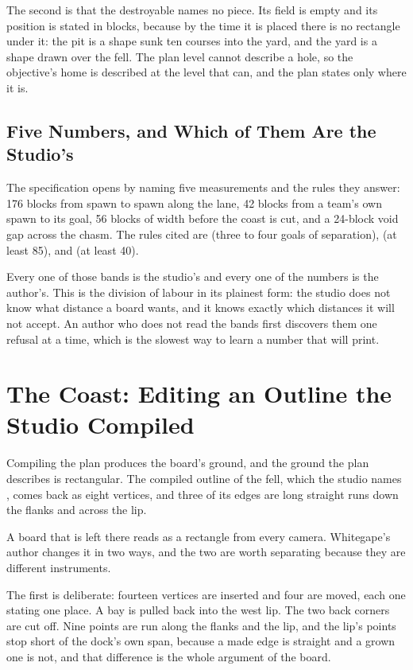 The second is that the destroyable names no piece. Its  field is
empty and its position is stated in blocks, because by the time it is placed
there is no rectangle under it: the pit is a shape sunk ten courses into the
yard, and the yard is a shape drawn over the fell. The plan level cannot
describe a hole, so the objective's home is described at the level that can,
and the plan states only where it is.

\subsection{Five Numbers, and Which of Them Are the Studio's}

The specification opens by naming five measurements and the rules they answer:
176 blocks from spawn to spawn along the lane, 42 blocks from a team's own
spawn to its goal, 56 blocks of width before the coast is cut, and a 24-block
void gap across the chasm. The rules cited are  (three to four goals
of separation),  (at least 85), and  (at least 40).

Every one of those bands is the studio's and every one of the numbers is the
author's. This is the division of labour in its plainest form: the studio does
not know what distance a board wants, and it knows exactly which distances it
will not accept. An author who does not read the bands first discovers them one
refusal at a time, which is the slowest way to learn a number that
 will print.

\section{The Coast: Editing an Outline the Studio Compiled}

Compiling the plan produces the board's ground, and the ground the plan
describes is rectangular. The compiled outline of the fell, which the studio
names , comes back as eight vertices, and three of its edges are
long straight runs down the flanks and across the lip.

A board that is left there reads as a rectangle from every camera. Whitegape's
author changes it in two ways, and the two are worth separating because they
are different instruments.

The first is deliberate: fourteen vertices are inserted and four are moved,
each one stating one place. A bay is pulled back into the west lip. The two
back corners are cut off. Nine points are run along the flanks and the lip, and
the lip's points stop short of the dock's own span, because a made edge is
straight and a grown one is not, and that difference is the whole argument of
the board.

